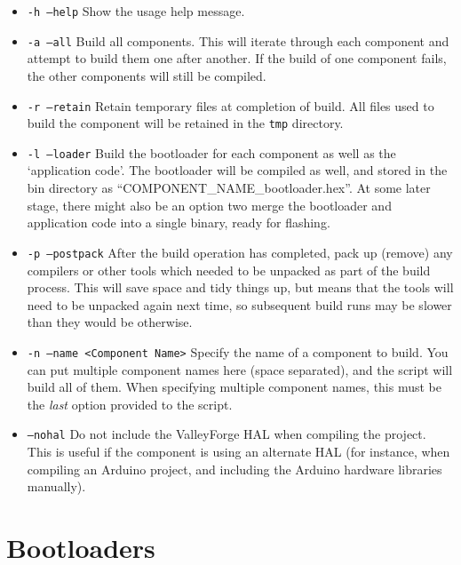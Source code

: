 \documentclass[a4paper, oneside, 11pt, titlepage, onecolumn, openright]{report}
\begin{document}
				\begin{itemize}
			
					\item \texttt{-h --help} Show the usage help message.
			
					\item	\texttt{-a --all} Build all components. This will iterate through each component and attempt to build them one after another.  If the build of one component fails, the other components will still be compiled.
			
					\item	\texttt{-r --retain} Retain temporary files at completion of build. All files used to build the component will be retained in the \texttt{tmp} directory.
			
					\item	\texttt{-l --loader} Build the bootloader for each component as well as the `application code'. The bootloader will be compiled as well, and stored in the bin directory as ``COMPONENT\_NAME\_bootloader.hex''.  At some later stage, there might also be an option two merge the bootloader and application code into a single binary, ready for flashing.
			
					\item	\texttt{-p --postpack} After the build operation has completed, pack up (remove) any compilers or other tools which needed to be unpacked as part of the build process.  This will save space and tidy things up, but means that the tools will need to be unpacked again next time, so subsequent build runs may be slower than they would be otherwise.			
			
					\item	\texttt{-n --name <Component Name>}	Specify the name of a component to build. You can put multiple component names here (space separated), and the script will build all of them. When specifying multiple component names, this must be the \emph{last} option provided to the script.
			
					\item   \texttt{--nohal} Do not include the ValleyForge HAL when compiling the project.  This is useful if the component is using an alternate HAL (for instance, when compiling an Arduino project, and including the Arduino hardware libraries manually).
			
				\end{itemize} 			

		\chapter{Bootloaders}
			\label{c:Bootloaders}
\end{document}
